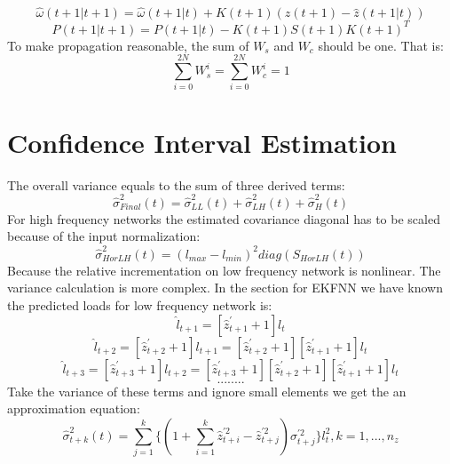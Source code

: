 \documentclass[letterpaper]{article}
\begin{document}
\begin{enumerate}
    \begin{equation}
      \hat{\omega}(t+1|t+1)=\hat{\omega}(t+1|t)+K(t+1)(z(t+1)-\hat{z}(t+1|t))
    \end{equation}
    \begin{equation}
      P(t+1|t+1)=P(t+1|t)-K(t+1)S(t+1)K(t+1)^T
    \end{equation}
    To make propagation reasonable, the sum of $W_s$ and $W_c$ should be one. That is:
    \begin{equation}
      \displaystyle\sum\limits_{i=0}^{2N} W_s^i=\displaystyle\sum\limits_{i=0}^{2N} W_c^i = 1
    \end{equation}
\end{enumerate}

\section*{Confidence Interval Estimation}
The overall variance equals to the sum of three derived terms:
\begin{equation}
  \hat{\sigma}_{Final}^2(t)=\hat{\sigma}_{LL}^2(t)+\hat{\sigma}_{LH}^2(t)+\hat{\sigma}_{H}^2(t)
\end{equation}
For high frequency networks the estimated covariance diagonal has to be scaled because of the input normalization:
\begin{equation}
  \hat{\sigma}_{H or LH}^2(t)=(l_{max}-l_{min})^2diag(S_{HorLH}(t))
\end{equation}
Because the relative incrementation on low frequency network is nonlinear. The variance calculation is more complex. In the section for EKFNN we have known the predicted loads for low frequency network is:
\[
  \hat{l}_{t+1}=[\hat{z}_{t+1}^\prime+1]l_t
\]
\[
  \hat{l}_{t+2}=[\hat{z}_{t+2}^\prime+1]l_{t+1}=[\hat{z}_{t+2}^\prime+1][\hat{z}_{t+1}^\prime+1]l_t
\]
\[
  \hat{l}_{t+3}=[\hat{z}_{t+3}^\prime+1]l_{t+2}=[\hat{z}_{t+3}^\prime+1][\hat{z}_{t+2}^\prime+1][\hat{z}_{t+1}^\prime+1]l_t
\]
\[ ........ \]
Take the variance of these terms and ignore small elements we get the an approximation equation:
\begin{equation}
  \hat{\sigma}_{t+k}^2(t)=\displaystyle\sum\limits_{j=1}^{k} \{(1+\displaystyle\sum\limits_{i=1}^{k}\hat{z}_{t+i}^{\prime2}-\hat{z}_{t+j}^{\prime2})\sigma_{t+j}^{\prime2}\}l_t^2,k=1,...,n_z
\end{equation}
\end{document}
